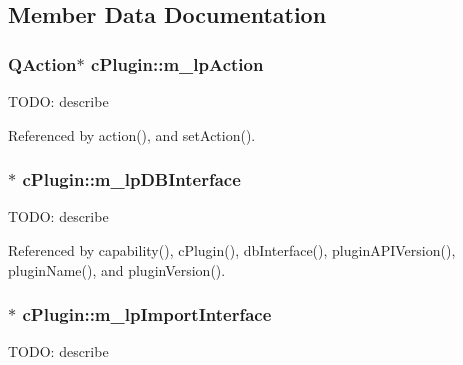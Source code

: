 \subsection{Member Data Documentation}
\subsubsection[{\texorpdfstring{m\+\_\+lp\+Action}{m_lpAction}}]{\setlength{\rightskip}{0pt plus 5cm}Q\+Action$\ast$ c\+Plugin\+::m\+\_\+lp\+Action\hspace{0.3cm}{\ttfamily [private]}}\hypertarget{classc_plugin_afb4ff0636dc58684867383cbf8408231}{}\label{classc_plugin_afb4ff0636dc58684867383cbf8408231}
T\+O\+DO\+: describe 

Referenced by action(), and set\+Action().

\subsubsection[{\texorpdfstring{m\+\_\+lp\+D\+B\+Interface}{m_lpDBInterface}}]{$\ast$ c\+Plugin\+::m\+\_\+lp\+D\+B\+Interface\hspace{0.3cm}{\ttfamily [private]}}\hypertarget{classc_plugin_a0dfe0fca935254e9c8e10766ebbd8cd1}{}\label{classc_plugin_a0dfe0fca935254e9c8e10766ebbd8cd1}
T\+O\+DO\+: describe 

Referenced by capability(), c\+Plugin(), db\+Interface(), plugin\+A\+P\+I\+Version(), plugin\+Name(), and plugin\+Version().

\subsubsection[{\texorpdfstring{m\+\_\+lp\+Import\+Interface}{m_lpImportInterface}}]{$\ast$ c\+Plugin\+::m\+\_\+lp\+Import\+Interface\hspace{0.3cm}{\ttfamily [private]}}\hypertarget{classc_plugin_a1f8cbfdab1de2df03c301d45ea286be1}{}\label{classc_plugin_a1f8cbfdab1de2df03c301d45ea286be1}
T\+O\+DO\+: describe 

